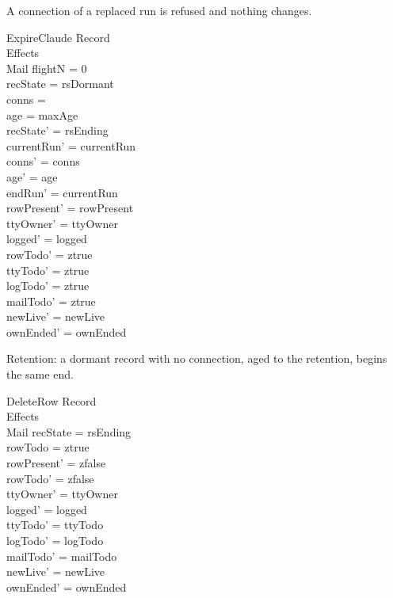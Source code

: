 \documentclass[a4paper,10pt,fleqn]{article}
\begin{document}
A connection of a replaced run is refused and nothing changes.

\begin{schema}{ExpireClaude}
  \Delta Record \\
  \Delta Effects \\
  \Xi Mail
  \where
  flightN = 0 \\
  recState = rsDormant \\
  conns = \emptyset \\
  age = maxAge \\
  recState' = rsEnding \\
  currentRun' = currentRun \\
  conns' = conns \\
  age' = age \\
  endRun' = currentRun \\
  rowPresent' = rowPresent \\
  ttyOwner' = ttyOwner \\
  logged' = logged \\
  rowTodo' = ztrue \\
  ttyTodo' = ztrue \\
  logTodo' = ztrue \\
  mailTodo' = ztrue \\
  newLive' = newLive \\
  ownEnded' = ownEnded
\end{schema}

Retention: a dormant record with no connection, aged to the retention, begins the
same end.

\begin{schema}{DeleteRow}
  \Xi Record \\
  \Delta Effects \\
  \Xi Mail
  \where
  recState = rsEnding \\
  rowTodo = ztrue \\
  rowPresent' = zfalse \\
  rowTodo' = zfalse \\
  ttyOwner' = ttyOwner \\
  logged' = logged \\
  ttyTodo' = ttyTodo \\
  logTodo' = logTodo \\
  mailTodo' = mailTodo \\
  newLive' = newLive \\
  ownEnded' = ownEnded
\end{schema}
\end{document}
